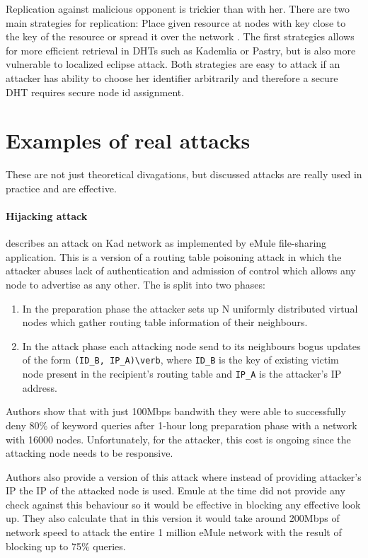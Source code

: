   Replication against malicious opponent is trickier than with her. There are
  two main strategies for replication: Place given resource at nodes with key
  close to the key of the resource or spread it over the network \cite[p.
  38]{urd11}. The first strategies allows for more efficient retrieval in DHTs
  such as Kademlia or Pastry, but is also more vulnerable to localized eclipse
  attack. Both strategies are easy to attack if an attacker has ability to
  choose her identifier arbitrarily and therefore a secure DHT requires secure
  node id assignment.

\section{Examples of real attacks}
These are not just theoretical divagations, but discussed attacks are really
used in practice and are effective.

\paragraph{Hijacking attack}
\cite{wan08} describes an attack on Kad network as implemented by eMule
file-sharing application. This is a version of a routing table poisoning attack
in which the attacker abuses lack of authentication and admission of control
which allows any node to advertise as any other. The is split into two phases:
\begin{enumerate}
  \item In the preparation phase the attacker sets up N uniformly distributed
    virtual nodes which gather routing table information of their neighbours.
  \item In the attack phase each attacking node send to its neighbours bogus
    updates of the form \verb|(ID_B, IP_A)\verb|, where \verb|ID_B| is the key
    of existing victim node present in the recipient's routing table and
    \verb|IP_A| is the attacker's IP address.
\end{enumerate}

Authors show that with just 100Mbps bandwith they were able to successfully
deny 80\% of keyword queries after 1-hour long preparation phase with a
network with 16000 nodes. Unfortunately, for the attacker, this cost is ongoing
since the attacking node needs to be responsive.

Authors also provide a version of this attack where instead of providing
attacker's IP the IP of the attacked node is used. Emule at the time did not
provide any check against this behaviour so it would be effective in blocking
any effective look up. They also calculate that in this version it would take
around 200Mbps of network speed to attack the entire 1 million eMule network
with the result of blocking up to 75\% queries.

